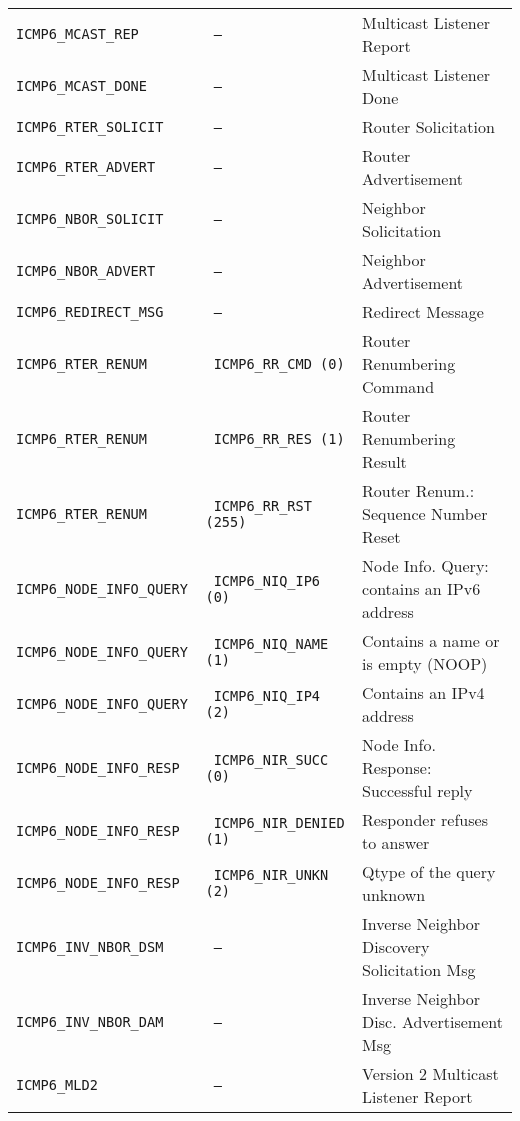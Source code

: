 \documentclass[documentation]{subfiles}
\begin{document}
\begin{longtable}{>{\tt}l>{\tt}ll}
    ICMP6\_MCAST\_REP        & ---                                 & Multicast Listener Report\\
    ICMP6\_MCAST\_DONE       & ---                                 & Multicast Listener Done\\
    ICMP6\_RTER\_SOLICIT     & ---                                 & Router Solicitation\\
    ICMP6\_RTER\_ADVERT      & ---                                 & Router Advertisement\\
    ICMP6\_NBOR\_SOLICIT     & ---                                 & Neighbor Solicitation\\
    ICMP6\_NBOR\_ADVERT      & ---                                 & Neighbor Advertisement\\
    ICMP6\_REDIRECT\_MSG     & ---                                 & Redirect Message\\
    ICMP6\_RTER\_RENUM       & ICMP6\_RR\_CMD \textnormal{(0)}     & Router Renumbering Command\\
    ICMP6\_RTER\_RENUM       & ICMP6\_RR\_RES \textnormal{(1)}     & Router Renumbering Result\\
    ICMP6\_RTER\_RENUM       & ICMP6\_RR\_RST \textnormal{(255)}   & Router Renum.: Sequence Number Reset\\
    ICMP6\_NODE\_INFO\_QUERY & ICMP6\_NIQ\_IP6 \textnormal{(0)}    & Node Info. Query: contains an IPv6 address\\
    ICMP6\_NODE\_INFO\_QUERY & ICMP6\_NIQ\_NAME \textnormal{(1)}   & Contains a name or is empty (NOOP)\\
    ICMP6\_NODE\_INFO\_QUERY & ICMP6\_NIQ\_IP4 \textnormal{(2)}    & Contains an IPv4 address\\
    ICMP6\_NODE\_INFO\_RESP  & ICMP6\_NIR\_SUCC \textnormal{(0)}   & Node Info. Response: Successful reply\\
    ICMP6\_NODE\_INFO\_RESP  & ICMP6\_NIR\_DENIED \textnormal{(1)} & Responder refuses to answer\\
    ICMP6\_NODE\_INFO\_RESP  & ICMP6\_NIR\_UNKN \textnormal{(2)}   & Qtype of the query unknown\\
    ICMP6\_INV\_NBOR\_DSM    & ---                                 & Inverse Neighbor Discovery Solicitation Msg\\
    ICMP6\_INV\_NBOR\_DAM    & ---                                 & Inverse Neighbor Disc. Advertisement Msg\\
    ICMP6\_MLD2              & ---                                 & Version 2 Multicast Listener Report\\

\end{longtable}
\end{document}
